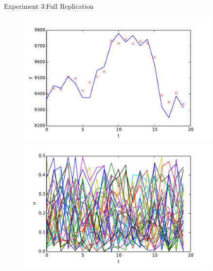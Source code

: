 \documentclass[handout]{beamer}
\begin{document}
\begin{frame}{Experiment 3:Full Replication}
   \begin{figure}
    \centering
    \includegraphics[width = 0.9\textwidth, height=0.4\textheight]{figure/DAXFull-y.pdf}\\
    \includegraphics[width = 0.9\textwidth, height=0.4\textheight]{figure/DAXFull-u.pdf}
   \end{figure}
\end{frame}
\end{document}
